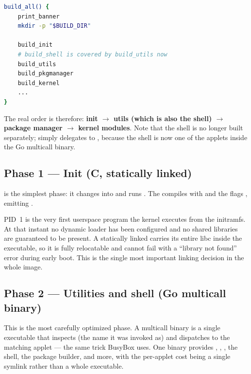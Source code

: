 \begin{lstlisting}[language=bash, caption={build.sh --- the build\_all driver and its phase order}]
build_all() {
    print_banner
    mkdir -p "$BUILD_DIR"

    build_init
    # build_shell is covered by build_utils now
    build_utils
    build_pkgmanager
    build_kernel
    ...
}
\end{lstlisting}

The real order is therefore: \textbf{init $\rightarrow$ utils (which is also
the shell) $\rightarrow$ package manager $\rightarrow$ kernel modules}. Note
that the shell is no longer built separately;  simply
delegates to , because the shell  is now one of
the applets inside the Go multicall binary.

\subsection{Phase 1 --- Init (C, statically linked)}

 is the simplest phase: it changes into  and runs
. The  compiles  with
 and the flags , emitting
.

\begin{infobox}
PID~1 is the very first userspace program the kernel executes from the
initramfs. At that instant no dynamic loader has been configured and no shared
libraries are guaranteed to be present. A statically linked 
carries its entire libc inside the executable, so it is fully relocatable and
cannot fail with a ``library not found'' error during early boot. This is the
single most important linking decision in the whole image.
\end{infobox}

\subsection{Phase 2 --- Utilities and shell (Go multicall binary)}

This is the most carefully optimized phase. A multicall binary is a single
executable that inspects  (the name it was invoked as) and
dispatches to the matching applet --- the same trick BusyBox uses. One binary
provides , , , the  shell, the
 package builder, and more, with the per-applet cost being a
single symlink rather than a whole executable.

